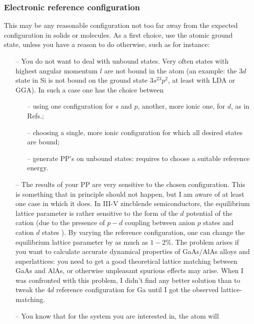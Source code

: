 \documentclass[12pt,a4paper]{article}
\begin{document}
\subsubsection{Electronic reference configuration}
\label{RefConf}
This may be any reasonable configuration not too far away from
the expected configuration in solids or molecules. As a first
choice, use the atomic ground state, unless you have a reason 
to do otherwise, such as for instance:
\begin{enumerate}
\item[--]
   You do not want to deal with unbound states.
   Very often states with highest angular momentum $l$ are not bound
   in the atom (an example: the $3d$ state in Si is not bound on the
   ground state $3s^23p^2$, at least with LDA or GGA). In such a case 
   one has the choice between 
   \begin{enumerate} 
      \item[--] using one configuration for $s$ and $p$, another, more
                ionic one, for $d$, as in Refs.\cite{BHS,Gonze};
      \item[--] choosing a single, more ionic configuration for which 
                all desired states are bound;
      \item[--] generate PP's on unbound states: requires to choose
                a suitable reference energy.
   \end{enumerate}
\item[--]
   The results of your PP are very sensitive to the chosen configuration.
   This is something that in principle should not happen, but
   I am aware of at least one case in which it does. In III-V
   zincblende semiconductors, the equilibrium lattice parameter
   is rather sensitive to the form of the $d$ potential of the 
   cation (due to the presence of $p-d$ coupling between anion 
   $p$ states and cation $d$ states \cite{Zunger}). By varying
   the reference configuration, one can change the equilibrium 
   lattice parameter by as much as $1-2\%$. 
   The problem arises if you want to calculate accurate dynamical
   properties of GaAs/AlAs alloys and superlattices: you need to
   get a good theoretical lattice matching between GaAs and AlAs,
   or otherwise unpleasant spurious effects may arise. When I was 
   confronted with this problem, I didn't find any better solution
   than to tweak the $4d$ reference configuration for Ga until I got
   the observed lattice-matching.
\item[--]
   You know that for the system you are interested in, the atom will 

\end{enumerate}
\end{document}
